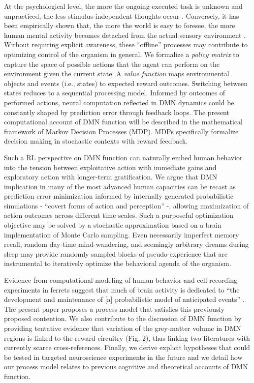 \documentclass[10pt,letterpaper]{article}
\begin{document}
At the psychological level,
the more the ongoing executed task is unknown and unpracticed,
the less stimulus-independent thoughts occur
\citep{filler1973daydreaming, teasdale1995stimulus, christoff2016mind}.
Conversely,
it has been empirically shown that, the more the world is easy to foresee,
the more human mental activity
becomes detached from the actual sensory environment
\citep{antrobus1966studies, pope1978regulation, mason2007, weiss2006}.
Without requiring explicit awareness,
these ``offline'' processes may contribute
to optimizing control of the organism in general.
We formalize
a \textit{policy matrix} to capture the space of possible actions that
the agent can perform
on the environment given the current state. A \textit{value function}
maps environmental objects and events (i.e., states) to expected reward outcomes.
Switching between states reduces to a sequential processing model.
Informed by outcomes of performed actions, neural computation reflected in
DMN dynamics could be constantly shaped by prediction error through feedback loops.
The present computational account of DMN function will be described in the mathematical framework of Markov Decision Processes (MDP). MDPs specifically formalize decision making in stochastic contexts with reward feedback.



Such a RL perspective on DMN function can naturally embed human behavior
into the tension between exploitative action with immediate gains and
exploratory action with longer-term gratification.
We argue that DMN implication in many
of the most advanced human capacities
can be recast as prediction error minimization
informed by internally generated probabilistic simulations
- ``covert forms of action and perception'' \citep{pezzulo2011grounding} -,
allowing maximization of action outcomes across different time scales.
Such a purposeful optimization objective
may be solved by a stochastic approximation
based on a brain implementation of Monte Carlo sampling.
Even necessarily imperfect memory recall,
random day-time mind-wandering, and
seemingly arbitrary dreams during sleep
may provide randomly sampled blocks of pseudo-experience  that are
instrumental to iteratively
optimize the behavioral agenda of the organism.



Evidence from computational modeling of human behavior \citep{kording2004bayesian} and cell recording experiments in ferrets \citep{fiser2004small} suggest that
much of brain activity is dedicated to
``the development and maintenance of [a]
probabilistic model of anticipated events''
\citep{raichle2005intrinsic}.
The present paper proposes a
process model that satisfies this previously proposed contention.
We also contribute to the discussion of DMN function
by providing tentative evidence that
variation of the grey-matter volume in DMN regions
is linked to the reward circuitry (Fig. 2),
thus linking two literatures with currently scarce cross-references.
Finally,
we derive explicit hypotheses that could be tested in targeted neuroscience
experiments in the future
and
we detail how our process model relates
to previous cognitive and theoretical accounts of DMN function.
\end{document}
